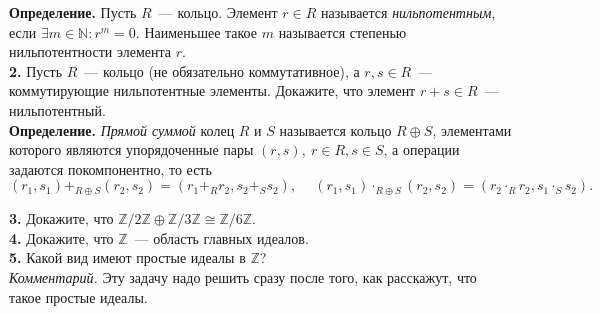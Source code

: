 \documentclass[a4, 12pt]{article}
\renewcommand{\bf}{\textbf}
\begin{document}
\bf{Определение.} Пусть $R$~--- кольцо. Элемент $r \in R$ называется \emph{нильпотентным}, если $\exists m \in \mathbb{N}\colon r^m = 0$. Наименьшее такое $m$ называется степенью нильпотентности элемента $r$.\\


\bf{2.} Пусть $R$~--- кольцо (не обязательно коммутативное), а $r, s \in R$~--- коммутирующие нильпотентные элементы. Докажите, что элемент $r + s \in R$~--- нильпотентный. \\

\bf{Определение.} \emph{Прямой суммой} колец $R$ и $S$ называется кольцо $R \oplus S$, элементами которого являются упорядоченные пары $(r, s), \ r \in R, s \in S$, а операции задаются покомпонентно, то есть
\[ (r_1, s_1) +_{R \oplus S} (r_2, s_2) = (r_1 +_{R} r_2, s_2 +_{S} s_2), \quad \ (r_1, s_1) \cdot_{R \oplus S} (r_2, s_2) = (r_2 \cdot_{R} r_2, s_1 \cdot_{S} s_2).\]

\bf{3.} Докажите, что  $\mathbb{Z}/2\mathbb{Z} \oplus \mathbb{Z}/3\mathbb{Z} \cong \mathbb{Z}/6\mathbb{Z}$.\\

\bf{4.} Докажите, что $\mathbb{Z}$~--- область главных идеалов.\\

\bf{5.} Какой вид имеют простые идеалы в $\mathbb{Z}$?\\

\emph{Комментарий.} Эту задачу надо решить сразу после того, как расскажут, что такое простые идеалы.
\end{document}
